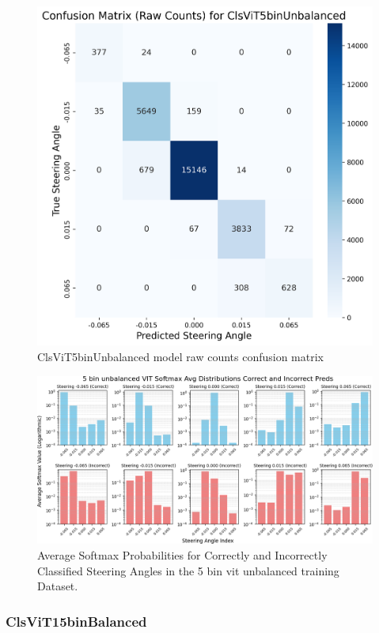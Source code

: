 \begin{figure}[H]
\centering
\includegraphics[width=0.65\linewidth]{Figures/Results/cm_raw_ClsViT5binUnbalanced.png}
\caption{ClsViT5binUnbalanced model raw counts confusion matrix}
\label{fig:cm_raw_ClsViT5binUnbalanced}
\end{figure}

\begin{figure}[H]
    \centering
    \includegraphics[width=1\linewidth]{Figures/Results/5_bins_vit_softmax_dist_plot_unbalanced.png}
    \caption{Average Softmax Probabilities for Correctly and Incorrectly Classified Steering Angles in the 5 bin vit unbalanced training Dataset.}
    \label{fig:5_bins_vit_softmax_dist_unbalanced}
\end{figure}


\subsubsection{ClsViT15binBalanced}

